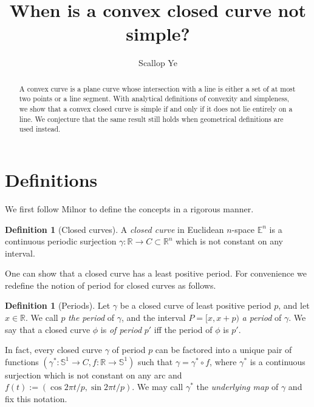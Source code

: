 \documentclass{amsart}
\title{When is a convex closed curve not simple?}
\author{Scallop Ye}
\theoremstyle{definition}
\newtheorem{definition}[proposition]{Definition}
\theoremstyle{remark}
\begin{document}
\begin{abstract}
    A convex curve is a plane curve whose intersection with a
    line is either a set of at most two points or a line segment.
    With analytical definitions of convexity and simpleness,
    we show that a convex closed curve is simple
    if and only if it does not lie entirely on a line.
    We conjecture that the same result still holds when
    geometrical definitions are used instead.
\end{abstract}

\maketitle

\section{Definitions}

We first follow Milnor \cite{milnor} to define the concepts in a rigorous manner.

\begin{definition}[Closed curves]
    \label{def:closed_curves}
    A \emph{closed curve} in Euclidean $n$-space $\mathbb{E}^n$ is a
    continuous periodic surjection $\gamma:\mathbb{R}\to C\subset\mathbb{R}^n$
    which is not constant on any interval.
\end{definition}

One can show that a closed curve has a least positive period.
For convenience we redefine the notion of period for closed curves
as follows.

\begin{definition}[Periods]
    \label{def:periods}
    Let $\gamma$ be a closed curve of least positive period $p$,
    and let $x\in\mathbb{R}$. We call $p$ \emph{the period} of $\gamma$,
    and the interval $P=[x,x+p)$ \emph{a period} of $\gamma$.
    We say that a closed curve $\phi$ is \emph{of period} $p'$
    iff the period of $\phi$ is $p'$.
\end{definition}

In fact, every closed curve $\gamma$ of period $p$
can be factored into a unique pair of functions
$(\gamma^*:\mathbb{S}^1\to C,f:\mathbb{R}\to\mathbb{S}^1)$ such that $\gamma=\gamma^*\circ f$,
where $\gamma^*$ is a continuous surjection which is not constant
on any arc and $f(t):=(\cos 2\pi t/p,\sin 2\pi t/p)$.
We may call $\gamma^*$ the \emph{underlying map} of $\gamma$
and fix this notation.
\end{document}
